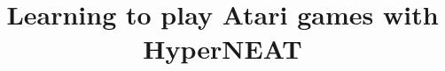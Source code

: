 \documentclass{acm_proc_article-sp}
\begin{document}
\title{Learning to play Atari games with HyperNEAT}
%
%
%
%
%
\end{document}
